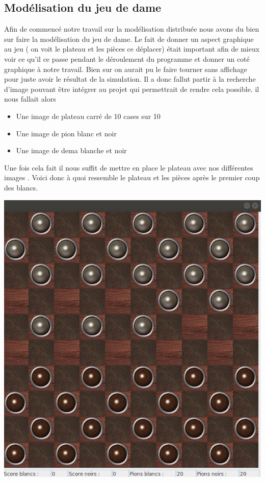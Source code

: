 \documentclass[11pt]{article} %
\begin{document}
\subsection{Modélisation du jeu de dame}
Afin de commencé notre travail sur la modélisation distribuée nous avons du bien sur faire la modélisation du jeu de dame. Le fait de donner un aspect graphique au jeu ( on voit le plateau et les pièces ce déplacer) était important afin de mieux voir ce qu'il ce passe pendant le déroulement du programme et donner un coté graphique à notre travail. Bien sur on aurait pu le faire tourner sans affichage pour juste avoir le résultat de la simulation. Il a donc fallut partir à la recherche d'image pouvant être intégrer au projet qui permettrait de rendre cela possible. il nous fallait alors
\begin{itemize}
\item Une image de plateau carré de 10 cases sur 10
\item Une image de pion blanc et noir
\item Une image de dema blanche et noir
\end{itemize}
Une fois cela fait il nous suffit de mettre en place le plateau avec nos différentes images \cite{annexe1}. Voici donc à quoi ressemble le plateau et les pièces après le premier coup des blancs.

\begin{center}
\includegraphics[scale=0.4]{plateau-ini}
\end{center}
\end{document}
